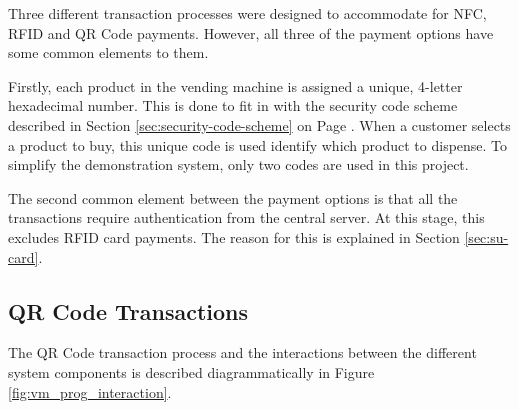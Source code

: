 Three different transaction processes were designed to accommodate for NFC, RFID
and QR Code payments. However, all three of the payment options have some common
elements to them. 

Firstly, each product in the vending machine is assigned a unique, 4-letter
hexadecimal number. This is done to fit in with the security code scheme
described in Section \ref{sec:security-code-scheme} on Page
\pageref{sec:security-code-scheme}. When a customer selects a product to buy,
this unique code is used identify which product to dispense. To simplify the
demonstration system, only two codes are used in this project.

The second common element between the payment options is that all the
transactions require authentication from the central server. At this stage, this
excludes RFID card payments. The reason for this is explained in Section
\ref{sec:su-card}. 

\subsection{QR Code Transactions}

The QR Code transaction process and the interactions between the different
system components is described diagrammatically in Figure
\ref{fig:vm_prog_interaction}.

